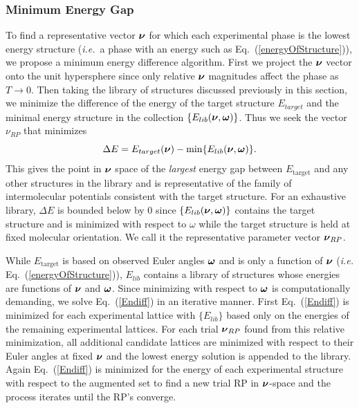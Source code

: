 \documentclass[preprint]{revtex4}
\newcommand{\mb}[1]{\ensuremath{\mbox{\boldmath $ #1 $}}}
\begin{document}
\subsubsection{Minimum Energy Gap}
\label{Minimum_Energy_Gap}

To find a representative vector $\mb{\nu}$ for which each
experimental phase is the lowest energy structure (\emph{i.e.}\ a
phase with an energy such as Eq.\ (\ref{energyOfStructure})), we
propose a minimum energy difference algorithm. First we project the
$\mb{\nu}$ vector onto the unit hypersphere since only relative
$\mb{\nu}$ magnitudes affect the phase as $T\rightarrow 0$. Then
taking the library of structures discussed previously in this
section, we minimize the difference of the energy of the target
structure $E_{target}$ and the minimal energy structure in the
collection $\{E_{lib}(\mb{\nu},\mb{\omega})\}$.  Thus we seek the
vector $\nu_{RP}$ that minimizes
\begin{equation}
\label{Endiff} \Delta E =
E_{target}(\mb{\nu})-\min\{E_{lib}(\mb{\nu},\mb{\omega})\}.
\end{equation}
This gives the point in $\mb{\nu}$ space of the \emph{largest}
energy gap between $E_{\mathrm{target}}$ and any other structures in
the library and is representative of the family of intermolecular
potentials consistent with the target structure. For an exhaustive
library, $\Delta E$ is bounded below by 0 since
$\{E_{lib}(\mb{\nu},\mb{\omega})\}$ contains the target structure
and is minimized with respect to $\omega$ while the target structure
is held at fixed molecular orientation. We call it the
representative parameter vector $\mb{\nu}_{RP}$.

While $E_{\mathrm{target}}$ is based on observed Euler angles
$\mb{\omega}$ and is only a function of $\mb{\nu}$ (\emph{i.e.} Eq.\
(\ref{energyOfStructure})), $E_{lib}$ contains a library of structures
whose energies are functions of $\mb{\nu}$ and $\mb{\omega}$. Since
minimizing with respect to $\mb{\omega}$ is computationally
demanding, we solve Eq.~(\ref{Endiff}) in an iterative manner. First
Eq.~(\ref{Endiff}) is minimized for each experimental lattice with
$\{E_{lib}\}$ based only on the energies of the remaining
experimental lattices. For each trial $\mb{\nu}_{RP}$ found from
this relative minimization, all additional candidate lattices are
minimized with respect to their Euler angles at fixed $\mb{\nu}$ and
the lowest energy solution is appended to the library. Again
Eq.~(\ref{Endiff}) is minimized for the energy of each experimental
structure with respect to the augmented set to find a new trial RP
in $\mb{\nu}$-space and the process iterates until the RP's
converge.
\end{document}

